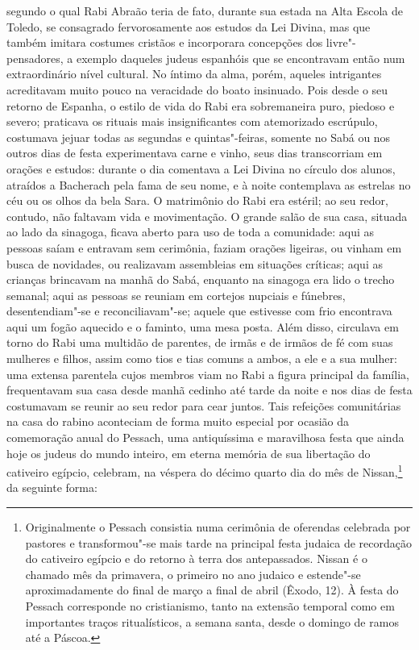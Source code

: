 segundo o qual Rabi Abraão teria de fato, durante sua estada na Alta
Escola de Toledo, se consagrado fervorosamente aos estudos da Lei
Divina, mas que também imitara costumes cristãos e incorporara
concepções dos livre"-pensadores, a exemplo daqueles judeus espanhóis
que se encontravam então num extraordinário nível cultural. No íntimo
da alma, porém, aqueles intrigantes acreditavam muito pouco na
veracidade do boato insinuado. Pois desde o seu retorno de Espanha, o
estilo de vida do Rabi era sobremaneira puro, piedoso e severo;
praticava os rituais mais insignificantes com atemorizado escrúpulo,
costumava jejuar todas as segundas e quintas"-feiras, somente no Sabá
ou nos outros dias de festa experimentava carne e vinho, seus dias
transcorriam em orações e estudos: durante o dia comentava a Lei Divina
no círculo dos alunos, atraídos a Bacherach pela fama de seu nome, e à
noite contemplava as estrelas no céu ou os olhos da bela Sara. O
matrimônio do Rabi era estéril; ao seu redor, contudo, não faltavam
vida e movimentação. O grande salão de sua casa, situada ao lado da
sinagoga, ficava aberto para uso de toda a comunidade: aqui as pessoas
saíam e entravam sem cerimônia, faziam orações ligeiras, ou vinham em
busca de novidades, ou realizavam assembleias em situações críticas;
aqui as crianças brincavam na manhã do Sabá, enquanto na sinagoga era
lido o trecho semanal; aqui as pessoas se reuniam em cortejos nupciais
e fúnebres, desentendiam"-se e reconciliavam"-se; aquele que
estivesse com frio encontrava aqui um fogão aquecido e o faminto, uma
mesa posta. Além disso, circulava em torno do Rabi uma multidão de
parentes, de irmãs e de irmãos de fé com suas mulheres e filhos, assim
como tios e tias comuns a ambos, a ele e a sua mulher: uma extensa
parentela cujos membros viam no Rabi a figura principal da família,
frequentavam sua casa desde manhã cedinho até tarde da noite e nos dias
de festa costumavam se reunir ao seu redor para cear juntos. Tais
refeições comunitárias na casa do rabino aconteciam de forma muito
especial por ocasião da comemoração anual do Pessach, uma antiquíssima
e maravilhosa festa que ainda hoje os judeus do mundo inteiro, em
eterna memória de sua libertação do cativeiro egípcio, celebram, na
véspera do décimo quarto dia do mês de
Nissan,\footnote{ Originalmente o Pessach consistia numa cerimônia de oferendas celebrada
por pastores e transformou"-se mais tarde na principal festa judaica
de recordação do cativeiro egípcio e do retorno à terra dos
antepassados. Nissan é o chamado mês da primavera, o primeiro no
ano judaico e estende"-se aproximadamente do final de março a final de
abril (Êxodo, 12). À festa do Pessach corresponde no cristianismo,
tanto na extensão temporal como em importantes traços ritualísticos, a
semana santa, desde o domingo de ramos até a Páscoa.}
da seguinte forma:

